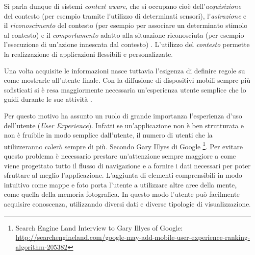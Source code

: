 Si parla dunque di sistemi \emph{context aware}, che si occupano cioè dell'\emph{acquisizione} del contesto (per esempio tramite l'utilizzo di determinati sensori), l'\emph{astrazione} e il \emph{riconoscimento} del contesto (per esempio per associare un determinato stimolo al contesto) e il \emph{comportamento} adatto alla situazione riconosciuta (per esempio l'esecuzione di un'azione innescata dal contesto) \cite{schmidt2003ubiquitous}. L'utilizzo del \emph{contesto} permette la realizzazione di applicazioni flessibili e personalizzate. 


Una volta acquisite le informazioni nasce tuttavia l'esigenza di definire regole su come mostrarle all'utente finale. Con la diffusione di dispositivi mobili sempre più sofisticati si è resa maggiormente necessaria un'esperienza utente semplice che lo guidi durante le sue attività .


Per questo motivo ha assunto un ruolo di grande importanza l'esperienza d'uso dell'utente (\emph{User Experience}). Infatti se un'applicazione non è ben strutturata e non è fruibile in modo semplice dall'utente, il numero di utenti che la utilizzeranno calerà sempre di più. Secondo Gary Illyes di Google \footnote{Search Engine Land Interview to Gary Illyes of Google: \url{http://searchengineland.com/google-may-add-mobile-user-experience-ranking-algorithm-205382}}. Per evitare questo problema è necessario prestare un'attenzione sempre maggiore a come viene progettato tutto il flusso di navigazione e a fornire i dati necessari per poter sfruttare al meglio l'applicazione. L'aggiunta di elementi comprensibili in modo intuitivo come mappe e foto porta l'utente a utilizzare altre aree della mente, come quella della memoria fotografica. In questo modo l'utente può facilmente acquisire conoscenza, utilizzando diversi dati e diverse tipologie di visualizzazione.


